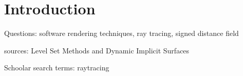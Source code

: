 \section{Introduction}
\label{section:Introduction}

Questions: software rendering techniques, ray tracing, signed distance field

sources: Level Set Methods and Dynamic Implicit Surfaces

Schoolar search terms: 
raytracing

